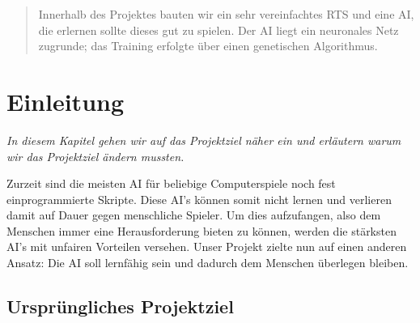 \documentclass[
	12pt,
	a4paper,
	BCOR10mm,
	DIV14,
	headsepline,
	usegeometry,
]{scrreprt}
\begin{document}
\restoregeometry


\tableofcontents

\begin{abstract}

	Innerhalb des Projektes bauten wir ein sehr vereinfachtes RTS und eine AI, die erlernen sollte dieses gut zu spielen. 
	Der AI liegt ein neuronales Netz zugrunde; das Training erfolgte über einen genetischen Algorithmus.

\end{abstract}


\chapter{Einleitung}
\label{Einleitung}

\textit{%
In diesem Kapitel gehen wir auf das Projektziel näher ein und erläutern warum wir das Projektziel ändern mussten.
}

\bigskip

Zurzeit sind die meisten AI für beliebige Computerspiele noch fest einprogrammierte Skripte. Diese AI's können somit nicht lernen und verlieren damit auf Dauer gegen menschliche Spieler. Um dies aufzufangen, also dem Menschen immer eine Herausforderung bieten zu können, werden die stärksten AI's mit unfairen Vorteilen versehen. Unser Projekt zielte nun auf einen anderen Ansatz: Die AI soll lernfähig sein und dadurch dem Menschen überlegen bleiben.

\section{Ursprüngliches Projektziel}
\end{document}
